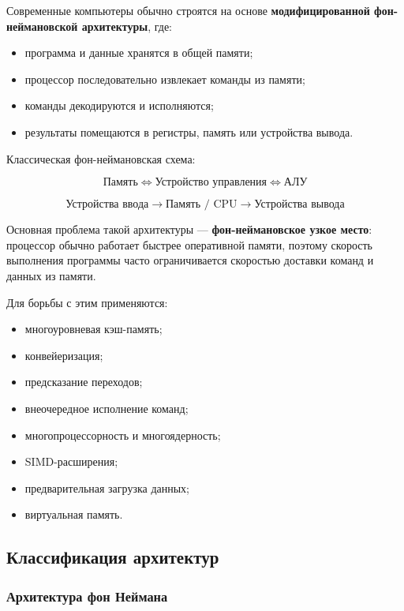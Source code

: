 \documentclass[12pt,a4paper]{article}
\theoremstyle{remark}
\begin{document}
Современные компьютеры обычно строятся на основе \textbf{модифицированной фон-неймановской архитектуры}, где:
\begin{itemize}
    \item программа и данные хранятся в общей памяти;
    \item процессор последовательно извлекает команды из памяти;
    \item команды декодируются и исполняются;
    \item результаты помещаются в регистры, память или устройства вывода.
\end{itemize}

Классическая фон-неймановская схема:

\[
\boxed{\text{Память}}
\Longleftrightarrow
\boxed{\text{Устройство управления}}
\Longleftrightarrow
\boxed{\text{АЛУ}}
\]

\[
\boxed{\text{Устройства ввода}}
\longrightarrow
\boxed{\text{Память / CPU}}
\longrightarrow
\boxed{\text{Устройства вывода}}
\]

Основная проблема такой архитектуры --- \textbf{фон-неймановское узкое место}: процессор обычно работает быстрее оперативной памяти, поэтому скорость выполнения программы часто ограничивается скоростью доставки команд и данных из памяти.

Для борьбы с этим применяются:
\begin{itemize}
    \item многоуровневая кэш-память;
    \item конвейеризация;
    \item предсказание переходов;
    \item внеочередное исполнение команд;
    \item многопроцессорность и многоядерность;
    \item SIMD-расширения;
    \item предварительная загрузка данных;
    \item виртуальная память.
\end{itemize}

\subsection{Классификация архитектур}

\subsubsection{Архитектура фон Неймана}
\end{document}
